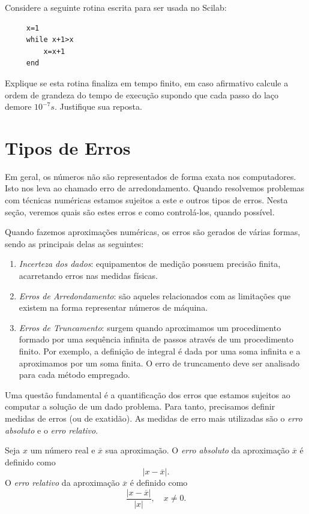\ifisscilab
\begin{exer}Considere a seguinte rotina escrita para ser usada no Scilab:
 \begin{verbatim}
     x=1
     while x+1>x
         x=x+1
     end
 \end{verbatim}
 Explique se esta rotina finaliza em tempo finito, em caso afirmativo calcule a ordem de grandeza do tempo de execução supondo que cada passo do laço demore $10^{-7}s$. Justifique sua reposta.
 \end{exer}
 
\section{Tipos de Erros}

Em geral, os números não são representados de forma exata nos computadores. Isto nos leva ao chamado erro de arredondamento. Quando resolvemos problemas com técnicas numéricas estamos sujeitos a este e outros tipos de erros. Nesta seção, veremos quais são estes erros e como controlá-los, quando possível.

Quando fazemos aproximações numéricas, os erros são gerados de várias formas, sendo as principais delas as seguintes:
\begin{enumerate}
 \item \emph{Incerteza dos dados}: equipamentos de medição possuem precisão finita, acarretando erros nas medidas físicas.
 \item \emph{Erros de Arredondamento}: são aqueles relacionados com as limitações que existem na forma representar números de máquina. 
 \item \emph{Erros de Truncamento}: surgem quando aproximamos um procedimento formado por uma sequência infinita de passos através de um procedimento finito. Por exemplo, a definição de integral é dada por uma soma infinita e a aproximamos por um soma finita. O erro de truncamento deve ser analisado para cada método empregado. 
\end{enumerate}

Uma questão fundamental é a quantificação dos erros que estamos sujeitos ao computar a solução de um dado problema. Para tanto, precisamos definir medidas de erros (ou de exatidão). As medidas de erro mais utilizadas são o \emph{erro absoluto} e o \emph{erro relativo}.

\begin{defn} Seja $x$ um número real e $\overline{x}$ sua aproximação. O \emph{erro absoluto} da aproximação $\overline{x}$ é definido como
  \begin{equation*}
    |x-\overline{x}|.
  \end{equation*}
O \emph{erro relativo} da aproximação $\overline{x}$ é definido como
\begin{equation*}
\frac{|x-\overline{x}|}{|x|},\quad x\neq 0.
\end{equation*}
\end{defn}

